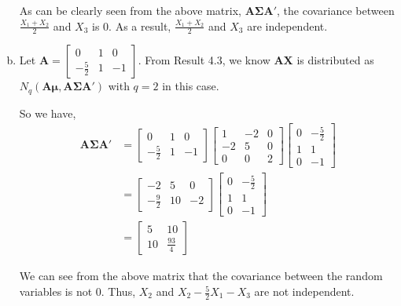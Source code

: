 \documentclass[12pt]{article}\usepackage[]{graphicx}\usepackage[]{color}
\newenvironment{problem}[2][Problem]{\begin{trivlist}
\item[\hskip \labelsep {\bfseries #1}\hskip \labelsep {\bfseries #2.}]}{\end{trivlist}}
\newcommand{\vct}{\mathbf}
\begin{document}
\begin{enumerate}[a)]
As can be clearly seen from the above matrix, $\vct{A}\vct{\Sigma}\vct{A}'$, the covariance between $\frac{X_1 + X_2}{2}$ and $X_3$ is 0. As a result, $\frac{X_1 + X_2}{2}$ and $X_3$ are independent.

\item Let $\vct{A} = \begin{bmatrix} 0 & 1 & 0 \\ -\frac{5}{2} & 1 & -1\end{bmatrix}$. From Result 4.3, we know $\vct{A}\vct{X}$ is distributed as $N_q(\vct{A}\vct{\mu}, \vct{A}\vct{\Sigma}\vct{A}')$ with $q = 2$ in this case.

So we have,
\begin{align*}
\vct{A}\vct{\Sigma}\vct{A}' &= \begin{bmatrix} 0 & 1 & 0 \\ -\frac{5}{2} & 1 & -1\end{bmatrix} \begin{bmatrix} 1 & -2 & 0 \\ -2 & 5 & 0 \\ 0 & 0 & 2 \end{bmatrix} \begin{bmatrix} 0 & -\frac{5}{2} \\ 1 & 1 \\ 0 & -1\end{bmatrix}\\
&= \begin{bmatrix} -2 & 5 & 0 \\ -\frac{9}{2} & 10 & -2\end{bmatrix} \begin{bmatrix} 0 & -\frac{5}{2} \\ 1 & 1 \\ 0 & -1\end{bmatrix}\\
&= \begin{bmatrix} 5 & 10 \\ 10 & \frac{93}{4} \end{bmatrix}
\end{align*}

We can see from the above matrix that the covariance between the random variables is not 0. Thus, $X_2$ and $X_2 - \frac{5}{2}X_1 - X_3$ are not independent.
\end{enumerate}

\begin{problem}{4.4}
\end{problem}
\end{document}
